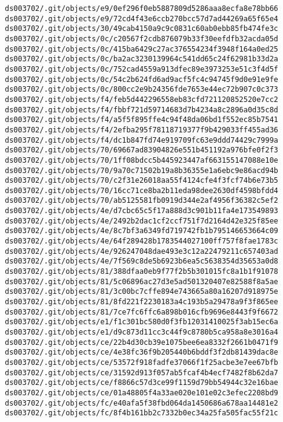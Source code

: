 \documentclass[11pt]{article}
\begin{document}
\begin{Verbatim}[commandchars=\\\{\}]
ds003702/.git/objects/e9/0ef296f0eb5887809d5286aaa8ecfa8e78bb66
ds003702/.git/objects/e9/72cd4f43e6ccb270bcc57d7ad44269a65f65e4
ds003702/.git/objects/30/49cab4150a9c9c0831c60ab0ebb85fb474fe3c
ds003702/.git/objects/0c/c20567f2cdb876079b33f30eefdfb32acda05d
ds003702/.git/objects/0c/415ba6429c27ac376554234f3948f164a0ed25
ds003702/.git/objects/0c/ba2ac3230139964c541dd65c24f62981b33d2a
ds003702/.git/objects/0c/752cad4559a913dfec89e3973253e51c3f4d5f
ds003702/.git/objects/0c/54c2b624fd6ad9acf5fc4c94745f9d0e91e9fe
ds003702/.git/objects/0c/800cc2e9b24356fde7653e44ec72b907c0c373
ds003702/.git/objects/f4/feb5d442296558eb83cfd721120852520e7cc2
ds003702/.git/objects/f4/fbbf721d59714683d7b4234a8c2896a0d35c8d
ds003702/.git/objects/f4/a5f5f895ffe4c94f48da06bd1f552ec85b7541
ds003702/.git/objects/f4/2efba295f78118719377f9b429033ff455ad36
ds003702/.git/objects/f4/dc1b847fd74e919709fc63e9ddd74429c7999a
ds003702/.git/objects/70/69667ad83904826e551b451192a976bfe0f2f3
ds003702/.git/objects/70/1ff08bdcc5b445923447af663155147088e10e
ds003702/.git/objects/70/9a70c71502b19a8b36355e1a6ebc9e86acd94b
ds003702/.git/objects/70/c2f31e26018aa55f4124cfe4f3fcf74b6e73b5
ds003702/.git/objects/70/16cc71ce8ba2b11eda98dee2630df4598bfdd4
ds003702/.git/objects/70/ab5125581fb0919d344e2af4956f36382c5ef2
ds003702/.git/objects/4e/d7cbc65c5f17a888d3c901b11fa4e173549893
ds003702/.git/objects/4e/2492b2dac1cf2ccf751f7d2164d42e325f85ee
ds003702/.git/objects/4e/8c7bf3a6349fd719742fb1b795146653664c09
ds003702/.git/objects/4e/64f289428b1783544027100ff757f8fae1783c
ds003702/.git/objects/4e/926247048dae493e3c12a22479211c657403ad
ds003702/.git/objects/4e/7f569c8de5b6923b6ea5c5638354d35653a0d8
ds003702/.git/objects/81/388dfaa0eb9f77f2b5b301015fc8a1b1f91078
ds003702/.git/objects/81/5c06896ac27d3e5ad501320407e82588f8a5ae
ds003702/.git/objects/81/3c00bc7cffe894e743665a80a16207d918975e
ds003702/.git/objects/81/8fd221f2230183a4c193b5a29478a9f3f865ee
ds003702/.git/objects/81/7ce7fc6ffc6a898b016cfb9696e8443f9f6672
ds003702/.git/objects/e1/f1c301bc580d0f3fb12031410025f3ab15ec6a
ds003702/.git/objects/e1/d9c873d11cc3c44f9c8780b5ca958a8e3016a4
ds003702/.git/objects/ce/22b4d30cb39e1075bee6ea8332f2661b0471f9
ds003702/.git/objects/ce/4e38fc36f9b205440b6bddf3f2db81439dac8e
ds003702/.git/objects/ce/53572f918fadfe37066f1f25acbe3e7ee67bfb
ds003702/.git/objects/ce/31592d913f057ab5fcaf4b4ecf7482f8b62da7
ds003702/.git/objects/ce/f8866c57d3ce99f1159d79bb54944c32e16bae
ds003702/.git/objects/ce/01a48805f4a33ae020e101e02c3efec2208bd9
ds003702/.git/objects/fc/e40afa5f38fbd064da1450686a678aa14481e2
ds003702/.git/objects/fc/8f4b161bb2c7332b0ec34a25fa505fac55f21c

\end{Verbatim}
\end{document}
